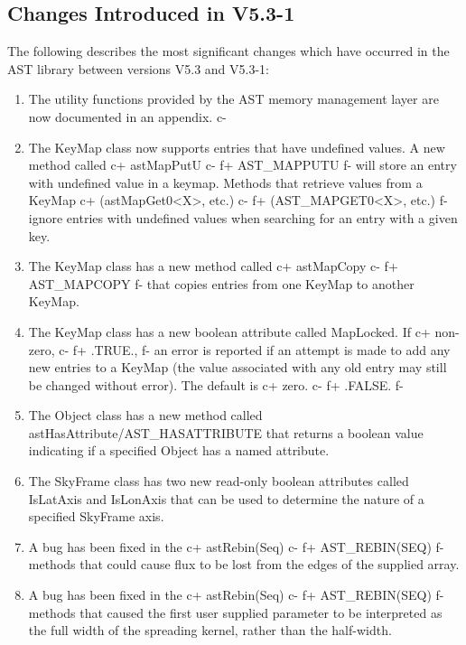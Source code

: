 \documentclass[twoside,11pt]{article}
\begin{document}
\subsection{Changes Introduced in V5.3-1}

The following describes the most significant changes which have
occurred in the AST library between versions V5.3 and V5.3-1:

\begin{enumerate}

c+
\item The utility functions provided by the AST memory management layer
are now documented in an appendix.
c-

\item The KeyMap class now supports entries that have undefined values. A
new method called
c+
astMapPutU
c-
f+
AST\_MAPPUTU
f-
will store an entry with undefined value in a keymap. Methods that
retrieve values from a KeyMap
c+
(astMapGet0<X>, etc.)
c-
f+
(AST\_MAPGET0<X>, etc.)
f-
ignore entries with undefined values when searching for an entry with a given
key.

\item The KeyMap class has a new method called
c+
astMapCopy
c-
f+
AST\_MAPCOPY
f-
that copies entries from one KeyMap to another KeyMap.

\item The KeyMap class has a new boolean attribute called MapLocked. If
c+
non-zero,
c-
f+
.TRUE.,
f-
an error is reported if an attempt is made to add any new entries
to a KeyMap (the value associated with any old entry may still be changed
without error). The default is
c+
zero.
c-
f+
.FALSE.
f-

\item The Object class has a new method called astHasAttribute/AST\_HASATTRIBUTE
that returns a boolean value indicating if a specified Object has a named
attribute.

\item The SkyFrame class has two new read-only boolean attributes called
IsLatAxis and IsLonAxis that can be used to determine the nature of a
specified SkyFrame axis.

\item A bug has been fixed in the
c+
astRebin(Seq)
c-
f+
AST\_REBIN(SEQ)
f-
methods that could cause flux to be lost from the edges of the supplied array.

\item A bug has been fixed in the
c+
astRebin(Seq)
c-
f+
AST\_REBIN(SEQ)
f-
methods that caused the first user supplied parameter to be interpreted as the
full width of the spreading kernel, rather than the half-width.


\end{enumerate}
\end{document}
